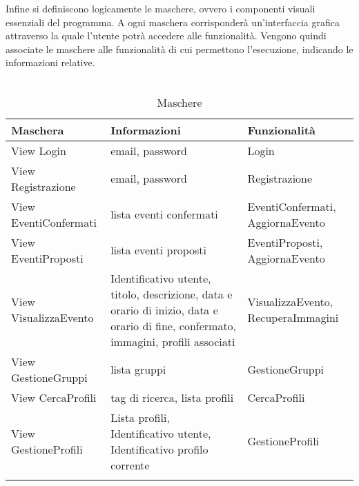 Infine si definiscono logicamente le maschere,
ovvero i componenti visuali essenziali del programma.
A ogni maschera corrisponderà un'interfaccia grafica
attraverso la quale l'utente potrà accedere alle funzionalità.
Vengono quindi associate le maschere alle funzionalità di cui permettono l'esecuzione,
indicando le informazioni relative.\\
\\

\begin{longtable} {|P{4.5cm}|P{6.5cm}|P{4cm}|}
    \hline
    \textbf{Maschera}     & \textbf{Informazioni}                                                                                                               & \textbf{Funzionalità}                     \\
    \hline
    \endhead
    View Login            & email, password                                                                                                                     & Login                                     \\
    \hline
    View Registrazione    & email, password                                                                                                                     & Registrazione                             \\
    \hline
    View EventiConfermati & lista eventi confermati                                                                                                             & EventiConfermati, AggiornaEvento          \\
    \hline
    View EventiProposti   & lista eventi proposti                                                                                                               & EventiProposti, \linebreak AggiornaEvento \\
    \hline
    View VisualizzaEvento & Identificativo utente, titolo, descrizione, data e orario di inizio, data e orario di fine, confermato, immagini, profili associati & VisualizzaEvento, RecuperaImmagini        \\
    \hline
    View GestioneGruppi   & lista gruppi                                                                                                                        & GestioneGruppi                            \\
    \hline
    View CercaProfili     & tag di ricerca, lista profili                                                                                                       & CercaProfili                              \\
    \hline
    View GestioneProfili  & Lista profili, Identificativo utente, Identificativo profilo corrente                                                               & GestioneProfili                           \\
    \hline
    \caption{Maschere}
\end{longtable}

